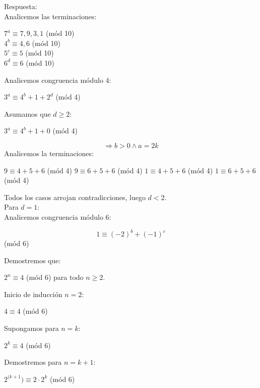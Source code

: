 \documentclass{book}
\begin{document}
\begin{enumerate}
        Respuesta:\\
        Analicemos las terminaciones:
        \begin{center}
            $7^a\equiv 7 ,9 ,3 ,1$ (mód 10)\\
            $4^b\equiv 4 ,6$ (mód 10)\\
            $5^c\equiv 5$ (mód 10)\\
            $6^d\equiv 6$ (mód 10)\\
        \end{center}
        Analicemos congruencia módulo 4:
        \begin{center}
            $3^a\equiv 4^b+1+2^d$  (mód 4)\\
        \end{center}
        Asumamos que $d\geq 2$:
        \begin{center}
            $3^a\equiv 4^b+1+0$ (mód 4)
        \end{center}
        $$\Rightarrow b>0 \wedge a=2k$$
        Analicemos la terminaciones:
        \begin{center}
            $9\equiv 4+5+6$ (mód 4)
            $9\equiv 6+5+6$ (mód 4)
            $1\equiv 4+5+6$ (mód 4)
            $1\equiv 6+5+6$ (mód 4)
        \end{center}
        Todos los casos arrojan contradicciones, luego $d<2$.\\
        Para $d=1$:\\
        Analicemos congruencia módulo 6:
        \begin{center}
            $$1\equiv{(-2)}^b+{(-1)}^c$$  (mód 6)\\
        \end{center}
        Demostremos que:
        \begin{center}
            $2^n\equiv 4$ (mód 6) para todo $n\geq2$.\\
        \end{center}
        Inicio de inducción $n=2$:
        \begin{center}
            $4\equiv 4$ (mód 6)\\
        \end{center}
        Supongamos para $n=k$:
        \begin{center}
            $2^k\equiv 4$ (mód 6)\\
        \end{center}
        Demostremos para $n=k+1$:
        \begin{center}
            $2^{(k+1})\equiv 2\cdot 2^k$  (mód 6)\\

\end{center}
\end{enumerate}
\end{document}
